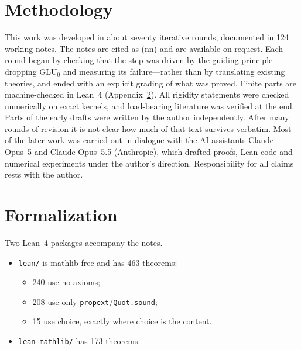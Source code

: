 \documentclass[11pt]{article}
\theoremstyle{definition}
\theoremstyle{remark}
\newcommand{\GLU}{\mathrm{GLU}}
\newcommand{\note}[1]{\textsf{(n#1)}}
\begin{document}
\section{Methodology}\label{sec:method}

This work was developed in about seventy iterative rounds, documented in 124 working notes. The notes are cited as \note{n} and are available on request. Each round began by checking that the step was driven by the guiding principle---dropping $\GLU_0$ and measuring its failure---rather than by translating existing theories, and ended with an explicit grading of what was proved. Finite parts are machine-checked in Lean~4 (Appendix~\ref{app:lean}). All rigidity statements were checked numerically on exact kernels, and load-bearing literature was verified at the end. Parts of the early drafts were written by the author independently. After many rounds of revision it is not clear how much of that text survives verbatim. Most of the later work was carried out in dialogue with the AI assistants Claude Opus~5 and Claude Opus~5.5 (Anthropic), which drafted proofs, Lean code and numerical experiments under the author's direction. Responsibility for all claims rests with the author.

\appendix
\section{Formalization}\label{app:lean}

Two Lean~4 packages accompany the notes.
\begin{itemize}
\item \texttt{lean/} is mathlib-free and has 463 theorems:
  \begin{itemize}
  \item 240 use no axioms;
  \item 208 use only \texttt{propext}/\texttt{Quot.sound};
  \item 15 use choice, exactly where choice is the content.
  \end{itemize}
\item \texttt{lean-mathlib/} has 173 theorems.
\end{itemize}
\end{document}
